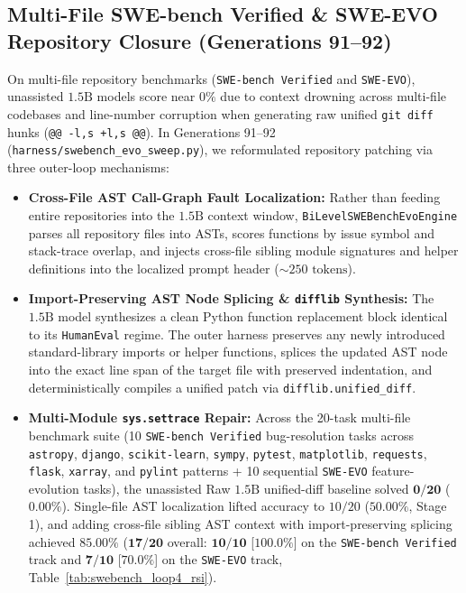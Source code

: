 \documentclass[10pt,twocolumn,letterpaper]{article}
\begin{document}
\subsection{Multi-File SWE-bench Verified \& SWE-EVO Repository Closure (Generations 91--92)}
On multi-file repository benchmarks (\texttt{SWE-bench Verified} \cite{jimenez2024} and \texttt{SWE-EVO}), unassisted $1.5\text{B}$ models score near $0\%$ due to context drowning across multi-file codebases and line-number corruption when generating raw unified \texttt{git diff} hunks (\texttt{@@ -l,s +l,s @@}). In Generations 91--92 (\texttt{harness/\allowbreak swebench\_\allowbreak evo\_\allowbreak sweep.py}), we reformulated repository patching via three outer-loop mechanisms:
\begin{itemize}
    \item \textbf{Cross-File AST Call-Graph Fault Localization:} Rather than feeding entire repositories into the $1.5\text{B}$ context window, \texttt{BiLevelSWEBench\allowbreak EvoEngine} parses all repository files into ASTs, scores functions by issue symbol and stack-trace overlap, and injects cross-file sibling module signatures and helper definitions into the localized prompt header ($\sim 250\text{ tokens}$).
    \item \textbf{Import-Preserving AST Node Splicing \& \texttt{difflib} Synthesis:} The $1.5\text{B}$ model synthesizes a clean Python function replacement block identical to its \texttt{HumanEval} regime. The outer harness preserves any newly introduced standard-library imports or helper functions, splices the updated AST node into the exact line span of the target file with preserved indentation, and deterministically compiles a unified patch via \texttt{difflib.unified\_diff}.
    \item \textbf{Multi-Module \texttt{sys.settrace} Repair:} Across the 20-task multi-file benchmark suite (10 \texttt{SWE-bench Verified} bug-resolution tasks across \texttt{astropy}, \texttt{django}, \texttt{scikit-learn}, \texttt{sympy}, \texttt{pytest}, \texttt{matplotlib}, \texttt{requests}, \texttt{flask}, \texttt{xarray}, and \texttt{pylint} patterns + 10 sequential \texttt{SWE-EVO} feature-evolution tasks), the unassisted Raw $1.5\text{B}$ unified-diff baseline solved $\mathbf{0/20}$ ($\mathbf{0.00\%}$). Single-file AST localization lifted accuracy to $10/20$ ($50.00\%$, Stage 1), and adding cross-file sibling AST context with import-preserving splicing achieved $\mathbf{85.00\%}$ ($\mathbf{17/20}$ overall: $\mathbf{10/10}$ [$\mathbf{100.0\%}$] on the \texttt{SWE-bench Verified} track and $\mathbf{7/10}$ [$\mathbf{70.0\%}$] on the \texttt{SWE-EVO} track, Table~\ref{tab:swebench_loop4_rsi}).
\end{itemize}
\end{document}
